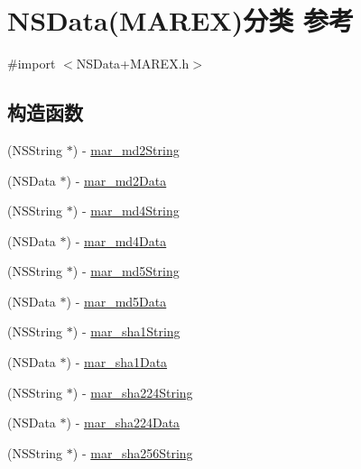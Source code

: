 \hypertarget{category_n_s_data_07_m_a_r_e_x_08}{}\section{N\+S\+Data(M\+A\+R\+EX)分类 参考}
\label{category_n_s_data_07_m_a_r_e_x_08}


{\ttfamily \#import $<$N\+S\+Data+\+M\+A\+R\+E\+X.\+h$>$}

\subsection*{构造函数}
\begin{DoxyCompactItemize}
\item 
(N\+S\+String $\ast$) -\/ \hyperlink{category_n_s_data_07_m_a_r_e_x_08_ac682393e7f8152934c03d5d9d36e202a}{mar\+\_\+md2\+String}
\item 
(N\+S\+Data $\ast$) -\/ \hyperlink{category_n_s_data_07_m_a_r_e_x_08_a9650ab82f6c2e403458cc33c030b6deb}{mar\+\_\+md2\+Data}
\item 
(N\+S\+String $\ast$) -\/ \hyperlink{category_n_s_data_07_m_a_r_e_x_08_a235188209f424f112bd8fab10bef48ee}{mar\+\_\+md4\+String}
\item 
(N\+S\+Data $\ast$) -\/ \hyperlink{category_n_s_data_07_m_a_r_e_x_08_a6f661777fe8ca67f31e3c83f67bda152}{mar\+\_\+md4\+Data}
\item 
(N\+S\+String $\ast$) -\/ \hyperlink{category_n_s_data_07_m_a_r_e_x_08_ac7dd9997dd4cad49fe1f545288b66b95}{mar\+\_\+md5\+String}
\item 
(N\+S\+Data $\ast$) -\/ \hyperlink{category_n_s_data_07_m_a_r_e_x_08_aead55f72b97954453003686fbf4526dc}{mar\+\_\+md5\+Data}
\item 
(N\+S\+String $\ast$) -\/ \hyperlink{category_n_s_data_07_m_a_r_e_x_08_a29a3ab82f7094f57e58c57d7f8c8f74a}{mar\+\_\+sha1\+String}
\item 
(N\+S\+Data $\ast$) -\/ \hyperlink{category_n_s_data_07_m_a_r_e_x_08_af25a612707f2b8fff5a585d3a25cdc50}{mar\+\_\+sha1\+Data}
\item 
(N\+S\+String $\ast$) -\/ \hyperlink{category_n_s_data_07_m_a_r_e_x_08_a0eb5fbcf085b5bdb69c7a42917654e81}{mar\+\_\+sha224\+String}
\item 
(N\+S\+Data $\ast$) -\/ \hyperlink{category_n_s_data_07_m_a_r_e_x_08_ac595c85006831988399c5b8a3fb8b4fc}{mar\+\_\+sha224\+Data}
\item 
(N\+S\+String $\ast$) -\/ \hyperlink{category_n_s_data_07_m_a_r_e_x_08_a5dab066d81b8b2edddaf7047e9ee5039}{mar\+\_\+sha256\+String}

\end{DoxyCompactItemize}
